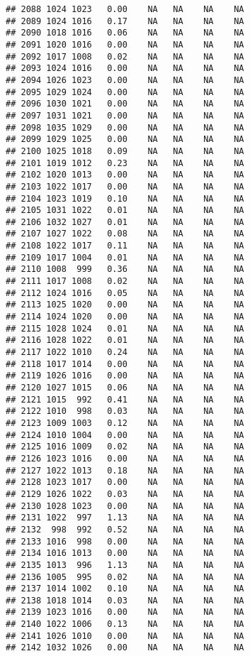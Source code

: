 \documentclass{article}\usepackage{graphicx, color}
\makeatletter
\newenvironment{kframe}{%
 \def\at@end@of@kframe{}%
 \ifinner\ifhmode%
  \def\at@end@of@kframe{\end{minipage}}%
  \begin{minipage}{\columnwidth}%
 \fi\fi%
 \def\FrameCommand##1{\hskip\@totalleftmargin \hskip-\fboxsep
 \colorbox{shadecolor}{##1}\hskip-\fboxsep
     \hskip-\linewidth \hskip-\@totalleftmargin \hskip\columnwidth}%
 \MakeFramed {\advance\hsize-\width
   \@totalleftmargin\z@ \linewidth\hsize
   \@setminipage}}%
 {\par\unskip\endMakeFramed%
 \at@end@of@kframe}
\newenvironment{knitrout}{}{} %
\makeatother
\begin{document}
\begin{knitrout}
\begin{kframe}
\begin{verbatim}
## 2088 1024 1023   0.00    NA   NA    NA    NA
## 2089 1024 1016   0.17    NA   NA    NA    NA
## 2090 1018 1016   0.06    NA   NA    NA    NA
## 2091 1020 1016   0.00    NA   NA    NA    NA
## 2092 1017 1008   0.02    NA   NA    NA    NA
## 2093 1024 1016   0.00    NA   NA    NA    NA
## 2094 1026 1023   0.00    NA   NA    NA    NA
## 2095 1029 1024   0.00    NA   NA    NA    NA
## 2096 1030 1021   0.00    NA   NA    NA    NA
## 2097 1031 1021   0.00    NA   NA    NA    NA
## 2098 1035 1029   0.00    NA   NA    NA    NA
## 2099 1029 1025   0.00    NA   NA    NA    NA
## 2100 1025 1018   0.09    NA   NA    NA    NA
## 2101 1019 1012   0.23    NA   NA    NA    NA
## 2102 1020 1013   0.00    NA   NA    NA    NA
## 2103 1022 1017   0.00    NA   NA    NA    NA
## 2104 1023 1019   0.10    NA   NA    NA    NA
## 2105 1031 1022   0.01    NA   NA    NA    NA
## 2106 1032 1027   0.01    NA   NA    NA    NA
## 2107 1027 1022   0.08    NA   NA    NA    NA
## 2108 1022 1017   0.11    NA   NA    NA    NA
## 2109 1017 1004   0.01    NA   NA    NA    NA
## 2110 1008  999   0.36    NA   NA    NA    NA
## 2111 1017 1008   0.02    NA   NA    NA    NA
## 2112 1024 1016   0.05    NA   NA    NA    NA
## 2113 1025 1020   0.00    NA   NA    NA    NA
## 2114 1024 1020   0.00    NA   NA    NA    NA
## 2115 1028 1024   0.01    NA   NA    NA    NA
## 2116 1028 1022   0.01    NA   NA    NA    NA
## 2117 1022 1010   0.24    NA   NA    NA    NA
## 2118 1017 1014   0.00    NA   NA    NA    NA
## 2119 1026 1016   0.00    NA   NA    NA    NA
## 2120 1027 1015   0.06    NA   NA    NA    NA
## 2121 1015  992   0.41    NA   NA    NA    NA
## 2122 1010  998   0.03    NA   NA    NA    NA
## 2123 1009 1003   0.12    NA   NA    NA    NA
## 2124 1010 1004   0.00    NA   NA    NA    NA
## 2125 1016 1009   0.02    NA   NA    NA    NA
## 2126 1023 1016   0.00    NA   NA    NA    NA
## 2127 1022 1013   0.18    NA   NA    NA    NA
## 2128 1023 1017   0.00    NA   NA    NA    NA
## 2129 1026 1022   0.03    NA   NA    NA    NA
## 2130 1028 1023   0.00    NA   NA    NA    NA
## 2131 1022  997   1.13    NA   NA    NA    NA
## 2132  998  992   0.52    NA   NA    NA    NA
## 2133 1016  998   0.00    NA   NA    NA    NA
## 2134 1016 1013   0.00    NA   NA    NA    NA
## 2135 1013  996   1.13    NA   NA    NA    NA
## 2136 1005  995   0.02    NA   NA    NA    NA
## 2137 1014 1002   0.10    NA   NA    NA    NA
## 2138 1018 1014   0.03    NA   NA    NA    NA
## 2139 1023 1016   0.00    NA   NA    NA    NA
## 2140 1022 1006   0.13    NA   NA    NA    NA
## 2141 1026 1010   0.00    NA   NA    NA    NA
## 2142 1032 1026   0.00    NA   NA    NA    NA

\end{verbatim}
\end{kframe}
\end{knitrout}
\end{document}
